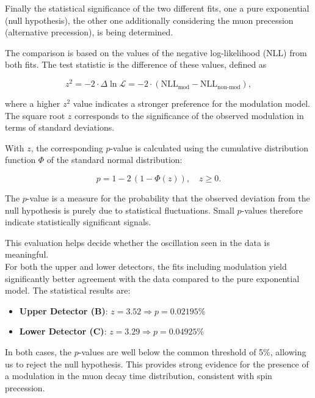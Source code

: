 Finally the statistical significance of the two different fits, one a pure exponential (null hypothesis), the other one additionally considering the muon precession (alternative precession), is being determined. 

The comparison is based on the values of the negative log-likelihood (NLL) from both fits. The test statistic is the difference of these values, defined as

\begin{equation}
    z^2 = -2 \cdot \Delta \ln \mathcal{L} = -2 \cdot (\mathrm{NLL}_{\text{mod}} - \mathrm{NLL}_{\text{non-mod}}),
\end{equation}

where a higher $z^2$ value indicates a stronger preference for the modulation model. The square root $z$ corresponds to the significance of the observed modulation in terms of standard deviations.


With $z$, the corresponding $p$-value is calculated using the cumulative distribution function $\Phi$ of the standard normal distribution:

\begin{equation}
    p = 1 - 2\,(1 - \Phi(z)), \quad z \ge 0.
\end{equation}

The $p$-value is a measure for the probability that the observed deviation from the null hypothesis is purely due to statistical fluctuations. Small $p$-values therefore indicate statistically significant signals.

This evaluation helps decide whether the oscillation seen in the data is meaningful.\\

For both the upper and lower detectors, the fits including modulation yield significantly better agreement with the data compared to the pure exponential model. The statistical results are:

\begin{itemize}
    \item \textbf{Upper Detector (B)}: $z = 3.52 \Rightarrow p = 0.02195\%$
    \item \textbf{Lower Detector (C)}:  $z = 3.29 \Rightarrow p = 0.04925\%$
\end{itemize}

In both cases, the $p$-values are well below the common threshold of 5\%, allowing us to reject the null hypothesis. This provides strong evidence for the presence of a modulation in the muon decay time distribution, consistent with spin precession.

